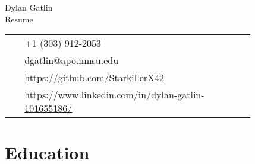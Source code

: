 \documentclass[10pt]{article} %
\begin{document}
\begin{paracol}{2} %

\parbox[top][0.08\textheight][c]{\linewidth}{ %
    \vspace{-0.04\textheight} %
    \centering %
    {\sffamily\Huge Dylan Gatlin}\\\medskip %
    {\Huge\color{headings}\cvtextfont Resume}
}

\switchcolumn
\parbox[top][0.08\textheight][c]{\linewidth}{
    \vspace{-0.04\textheight}
    \colorbox{shade}{ %
        \begin{supertabular}{p{0.05\linewidth}|p{0.775\linewidth}}
            \raisebox{-1pt}{\faPhone} & +1 (303) 912-2053 \\
            \raisebox{0pt}{\small\faEnvelope} &
            \href{mailto:dgatlin@apo.nmsu.edu}
                {dgatlin@apo.nmsu.edu} \\
            \raisebox{-1pt}{\faGithub} &
             \href{https://github.com/StarkillerX42}
             {https://github.com/StarkillerX42} \\
            \raisebox{-1pt}{\faLinkedinSquare} & 
            \href{https://www.linkedin.com/in/dylan-gatlin-101655186/}
            {https://www.linkedin.com/in/dylan-gatlin-101655186/} \\
        \end{supertabular}
    }
}
\switchcolumn


\medskip
\section{Education} 


\end{paracol}
\end{document}
